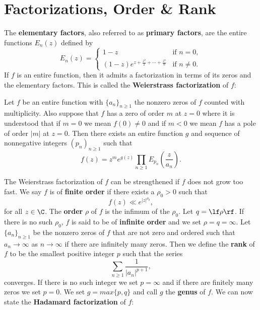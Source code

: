   \section{Factorizations, Order \& Rank}\label{append:Factorizations_and_Finite_Order}
    The \textbf{elementary factors}, also referred to as \textbf{primary factors}, are the entire functions $E_{n}(z)$ defined by
    \[
      E_{n}(z) = \begin{cases} 1-z & \text{if } n = 0, \\ (1-z)e^{z+\frac{z^{2}}{2}+\cdots+\frac{z^{n}}{n}} & \text{if } n \neq 0. \end{cases}
    \]
    If $f$ is an entire function, then it admits a factorization in terms of its zeros and the elementary factors. This is called the \textbf{Weierstrass factorization} of $f$:

    \begin{theorem}
      Let $f$ be an entire function with $\{a_{n}\}_{n \ge 1}$ the nonzero zeros of $f$ counted with multiplicity. Also suppose that $f$ has a zero of order $m$ at $z = 0$ where it is understood that if $m = 0$ we mean $f(0) \neq 0$ and if $m < 0$ we mean $f$ has a pole of order $|m|$ at $z = 0$. Then there exists an entire function $g$ and sequence of nonnegative integers $(p_{n})_{n \ge 1}$ such that
      \[
        f(z) = z^{m}e^{g(z)}\prod_{n \ge 1}E_{p_{n}}\left(\frac{z}{a_{n}}\right).
      \]
    \end{theorem}

    The Weierstrass factorization of $f$ can be strengthened if $f$ does not grow too fast. We say $f$ is of \textbf{finite order} if there exists a $\rho_{0} > 0$ such that
    \[
      f(z) \ll e^{|z|^{\rho_{0}}},
    \]
    for all $z \in \C$. The \textbf{order} $\rho$ of $f$ is the infimum of the $\rho_{0}$. Let $q = \lf \rho \rf$. If there is no such $\rho_{0}$, $f$ is said to be of \textbf{infinite order} and we set $\rho = q = \infty$. Let $\{a_{n}\}_{n \ge 1}$ be the nonzero zeros of $f$ that are not zero and ordered such that $a_{n} \to \infty$ as $n \to \infty$ if there are infinitely many zeros. Then we define the \textbf{rank} of $f$ to be the smallest positive integer $p$ such that the series
    \[
      \sum_{n \ge 1}\frac{1}{|a_{n}|^{p+1}},
    \]
    converges. If there is no such integer we set $p = \infty$ and if there are finitely many zeros we set $p = 0$. We set $g = max\{p,q\}$ and call $g$ the \textbf{genus} of $f$. We can now state the \textbf{Hadamard factorization} of $f$:

